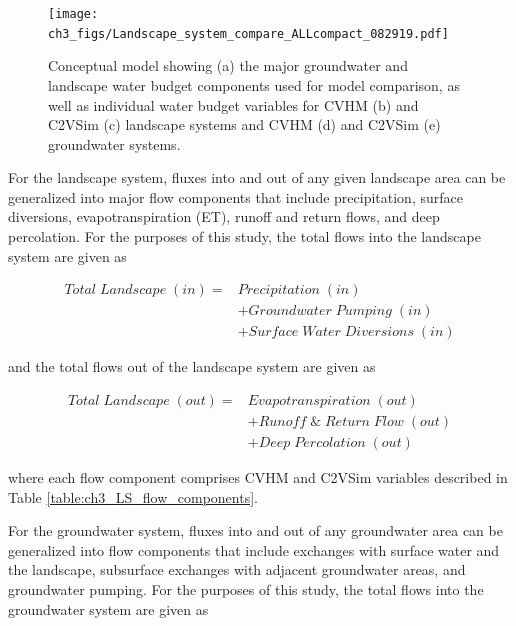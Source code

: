 \begin{figure}[ht!]
\centerline{\texttt{[image: ch3\_figs/Landscape\_system\_compare\_ALLcompact\_082919.pdf]}}
\caption{Conceptual model showing (a) the major groundwater and landscape water budget components used for model comparison, as well as individual water budget variables for CVHM (b) and C2VSim (c) landscape systems and CVHM (d) and C2VSim (e) groundwater systems.}
\label{fig:ch3_conceptual}
\end{figure}

For the landscape system, fluxes into and out of any given landscape area can be generalized into major flow components that include precipitation, surface diversions, evapotranspiration (ET), runoff and return flows, and deep percolation. For the purposes of this study, the total flows into the landscape system are given as 

\begin{equation}
\begin{aligned}
Total \; Landscape \; (in) ={} & Precipitation \; (in) \\
& + Groundwater \; Pumping \; (in) \\
& + Surface \; Water \; Diversions \; (in)
\end{aligned}
\end{equation}

\noindent and the total flows out of the landscape system are given as

\begin{equation}
\begin{aligned}
Total \; Landscape \; (out) ={} & Evapotranspiration \; (out) \\
& + Runoff \; \& \; Return \; Flow \; (out) \\
& + Deep \; Percolation \; (out)
\end{aligned}
\end{equation}

\noindent where each flow component comprises CVHM and C2VSim variables described in Table \ref{table:ch3_LS_flow_components}.



For the groundwater system, fluxes into and out of any groundwater area can be generalized into flow components that include exchanges with surface water and the landscape, subsurface exchanges with adjacent groundwater areas, and groundwater pumping. For the purposes of this study, the total flows into the groundwater system are given as 

